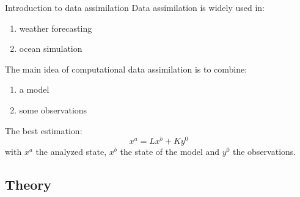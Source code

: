\begin{frame}{Introduction to data assimilation}
    Data assimilation is widely used in:
    \begin{enumerate}[\textbullet]
           \item weather forecasting
           \item ocean simulation
    \end{enumerate}	 
          The main idea of computational data assimilation is to combine:
    \begin{enumerate}[\textbullet]
           \item a model
           \item some observations
    \end{enumerate}	 
    The best estimation:
    $$x^a=Lx^b+Ky^0$$
    with $x^a$ the analyzed state, $x^b$ the state of the model and $y^0$ the observations.
   \end{frame}

   \subsection{Theory}
   

